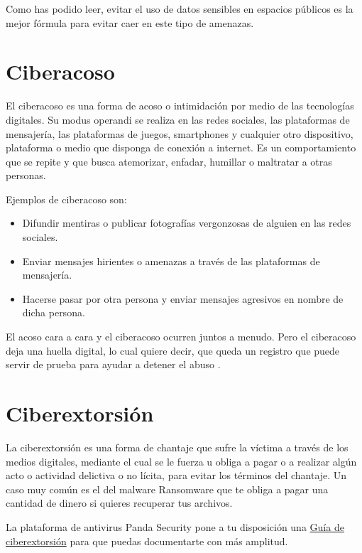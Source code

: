 \documentclass[
  a4paper,
  openany]{book}
\begin{document}
Como has podido leer, evitar el uso de datos sensibles en espacios públicos es la mejor fórmula para evitar caer en este tipo de amenazas.

\hypertarget{ciberacoso}{%
\section{Ciberacoso}\label{ciberacoso}}

El ciberacoso es una forma de acoso o intimidación por medio de las tecnologías digitales. Su modus operandi se realiza en las redes sociales, las plataformas de mensajería, las plataformas de juegos, smartphones y cualquier otro dispositivo, plataforma o medio que disponga de conexión a internet. Es un comportamiento que se repite y que busca atemorizar, enfadar, humillar o maltratar a otras personas.

Ejemplos de ciberacoso son:

\begin{itemize}
\item
  Difundir mentiras o publicar fotografías vergonzosas de alguien en las redes sociales.
\item
  Enviar mensajes hirientes o amenazas a través de las plataformas de mensajería.
\item
  Hacerse pasar por otra persona y enviar mensajes agresivos en nombre de dicha persona.
\end{itemize}

El acoso cara a cara y el ciberacoso ocurren juntos a menudo. Pero el ciberacoso deja una huella digital, lo cual quiere decir, que queda un registro que puede servir de prueba para ayudar a detener el abuso \citep{ciberacoso}.

\hypertarget{ciberextorsiuxf3n}{%
\section{Ciberextorsión}\label{ciberextorsiuxf3n}}

La ciberextorsión es una forma de chantaje que sufre la víctima a través de los medios digitales, mediante el cual se le fuerza u obliga a pagar o a realizar algún acto o actividad delictiva o no lícita, para evitar los términos del chantaje. Un caso muy común es el del malware Ransomware que te obliga a pagar una cantidad de dinero si quieres recuperar tus archivos.

La plataforma de antivirus Panda Security pone a tu disposición una \href{https://www.pandasecurity.com/es/mediacenter/src/uploads/2016/02/Guia_Ciberextorsion-es.pdf}{Guía de ciberextorsión} para que puedas documentarte con más amplitud.
\end{document}

